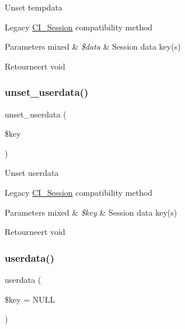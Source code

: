 Unset tempdata

Legacy \mbox{\hyperlink{class_c_i___session}{C\+I\+\_\+\+Session}} compatibility method


\begin{DoxyParams}[1]{Parameters}
mixed & {\em \$data} & Session data key(s) \\
\hline
\end{DoxyParams}
\begin{DoxyReturn}{Retourneert}
void 
\end{DoxyReturn}
\mbox{\label{class_c_i___session_a8d3a4935d2ff2088f11654445d9a0122}} 
\subsubsection{\texorpdfstring{unset\_userdata()}{unset\_userdata()}}
{\footnotesize\ttfamily unset\+\_\+userdata (\begin{DoxyParamCaption}\item[{}]{\$key }\end{DoxyParamCaption})}

Unset userdata

Legacy \mbox{\hyperlink{class_c_i___session}{C\+I\+\_\+\+Session}} compatibility method


\begin{DoxyParams}[1]{Parameters}
mixed & {\em \$key} & Session data key(s) \\
\hline
\end{DoxyParams}
\begin{DoxyReturn}{Retourneert}
void 
\end{DoxyReturn}
\mbox{\label{class_c_i___session_ab10006d10762845f93392ef4c2884df6}} 
\subsubsection{\texorpdfstring{userdata()}{userdata()}}
{\footnotesize\ttfamily userdata (\begin{DoxyParamCaption}\item[{}]{\$key = {\ttfamily NULL} }\end{DoxyParamCaption})}

